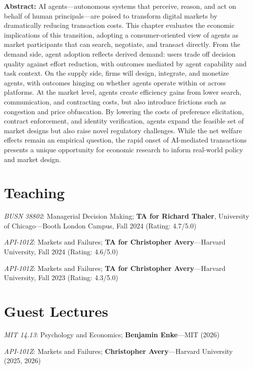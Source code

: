 \documentclass[margin,line,pifont,palatino,courier, 9pt]{res}
\begin{document}
\begin{resume}
\begin{singlespace}
\footnotesize
\textbf{Abstract:}
AI agents---autonomous systems that perceive, reason, and act on behalf of human principals---are poised to transform digital markets by dramatically reducing transaction costs. This chapter evaluates the economic implications of this transition, adopting a consumer-oriented view of agents as market participants that can search, negotiate, and transact directly. From the demand side, agent adoption reflects derived demand: users trade off decision quality against effort reduction, with outcomes mediated by agent capability and task context. On the supply side, firms will design, integrate, and monetize agents, with outcomes hinging on whether agents operate within or across platforms. At the market level, agents create efficiency gains from lower search, communication, and contracting costs, but also introduce frictions such as congestion and price obfuscation. By lowering the costs of preference elicitation, contract enforcement, and identity verification, agents expand the feasible set of market designs but also raise novel regulatory challenges. While the net welfare effects remain an empirical question, the rapid onset of AI-mediated transactions presents a unique opportunity for economic research to inform real-world policy and market design.
\end{singlespace}

\section{\sc Teaching}
\textit{BUSN 38802}: Managerial Decision Making; \textbf{TA for Richard Thaler}, University of Chicago---Booth London Campus, Fall 2024 (Rating: 4.7/5.0)

\textit{API-101Z}: Markets and Failures; \textbf{TA for Christopher Avery}---Harvard University, Fall 2024 (Rating: 4.6/5.0)

\textit{API-101Z}: Markets and Failures; \textbf{TA for Christopher Avery}---Harvard University, Fall 2023 (Rating: 4.3/5.0)

\section{\sc Guest Lectures}
\textit{MIT 14.13}: Psychology and Economics; \textbf{Benjamin Enke}---MIT (2026)

\textit{API-101Z}: Markets and Failures; \textbf{Christopher Avery}---Harvard University (2025, 2026) 


\end{resume}
\end{document}
